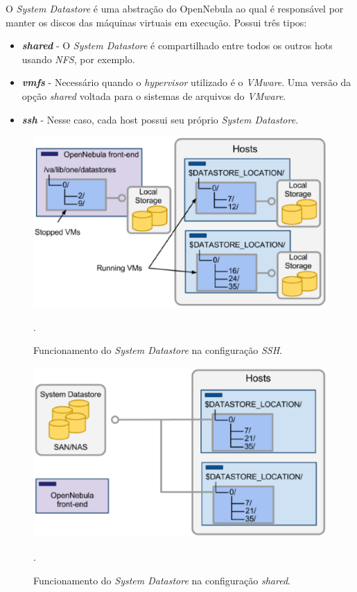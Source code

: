 O \textit{System Datastore} é uma abstração do OpenNebula ao qual é responsável por manter os discos das máquinas virtuais em execução. Possui três tipos\cite{opennebula}:

\begin{itemize}
\item \textit{\textbf{shared}} - O \textit{System Datastore} é compartilhado entre todos os outros hots usando \textit{NFS}, por exemplo.
\item \textit{\textbf{vmfs}} - Necessário quando o \textit{hypervisor} utilizado é o \textit{VMware}. Uma versão da opção \textit{shared} voltada para o sistemas de arquivos do \textit{VMware}.
\item \textit{\textbf{ssh}} - Nesse caso, cada host possui seu próprio \textit{System Datastore}.
\end{itemize}

\begin{figure}[!htb]
\centering
\includegraphics [keepaspectratio=true,scale=0.60]{figuras/ssh_datastore.eps}
\caption{Funcionamento do \textit{System Datastore} na configuração \textit{SSH}.}
\cite{opennebula}.
\label{ssh_datastore}
\end{figure}

\begin{figure}[!htb]
\centering
\includegraphics [keepaspectratio=true,scale=0.60]{figuras/shared_datastore.eps}
\caption{Funcionamento do \textit{System Datastore} na configuração \textit{shared}. }
\cite{opennebula}.
\label{shared_datastore}
\end{figure}

